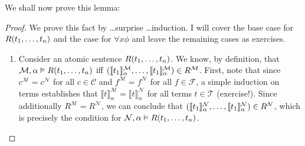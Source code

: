 \begin{enumerate}[\thesection.1]
            We shall now prove this lemma:

            \begin{proof}
              We prove this fact by \dots surprise \dots induction. I
              will cover the base case for $R(t_1, \mathellipsis,
              t_n)$ and the case for $\forall x\phi$ and leave the
              remaining cases as exercises.

              \begin{enumerate}

                \item Consider an atomic sentence  $R(t_1,
                  \mathellipsis, t_n)$. We know, by definition, that
                  $\mathcal{M},\alpha\vDash R(t_1, \mathellipsis,
                  t_n)$ iff $(\llbracket
                  t_1\rrbracket_\alpha^\mathcal{M}, \mathellipsis,
                  \llbracket t_1\rrbracket_\alpha^\mathcal{M}) \in
                  R^\mathcal{M}$. First, note that since
                  $c^\mathcal{M}=c^\mathcal{N}$ for all $c\in
                  \mathcal{C}$ and $f^\mathcal{M}=f^\mathcal{N}$ for
                  all $f\in\mathcal{F}$, a simple induction on terms
                  establishes that $\llbracket
                  t\rrbracket^\mathcal{M}_\alpha=\llbracket
                  t\rrbracket^\mathcal{N}_\alpha$ for all terms $t\in
                  \mathcal{T}$ (exercise!).
                  Since additionally  $R^\mathcal{M}=R^\mathcal{N}$,
                  we can conclude that $(\llbracket
                  t_1\rrbracket_\alpha^\mathcal{N}, \mathellipsis,
                  \llbracket t_1\rrbracket_\alpha^\mathcal{N}) \in
                  R^\mathcal{N}$, which is precisely the condition for
                  $\mathcal{N},\alpha\vDash R(t_1, \mathellipsis,
                  t_n)$.


\end{enumerate}
\end{proof}
\end{enumerate}
